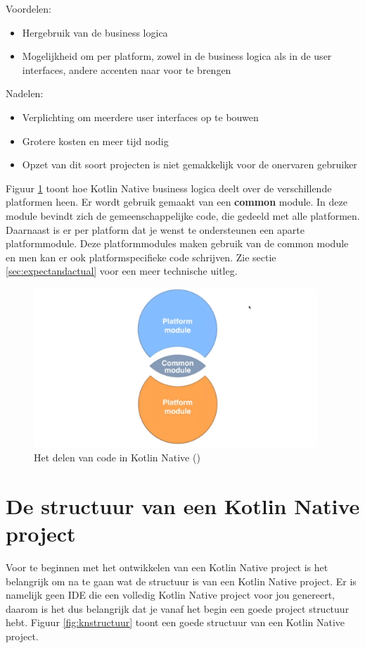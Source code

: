 Voordelen:
\begin{itemize}
	\item Hergebruik van de business logica
	\item Mogelijkheid om per platform, zowel in de business logica als in de user interfaces, andere accenten naar voor te brengen
\end{itemize}

Nadelen:
\begin{itemize}
	\item Verplichting om meerdere user interfaces op te bouwen
	\item Grotere kosten en meer tijd nodig
	\item Opzet van dit soort projecten is niet gemakkelijk voor de onervaren gebruiker
\end{itemize}

Figuur \ref{fig:sharingcode} toont hoe Kotlin Native business logica deelt over de verschillende platformen heen. Er wordt gebruik gemaakt van een \textbf{common} module. In deze module bevindt zich de gemeenschappelijke code, die gedeeld met alle platformen. Daarnaast is er per platform dat je wenst te ondersteunen een aparte platformmodule. Deze platformmodules maken gebruik van de common module en men kan er ook platformspecifieke code schrijven. Zie sectie \ref{sec:expectandactual} voor een meer technische uitleg.

\begin{figure} [ht]
	\centering
	\includegraphics[width=0.95\textwidth]{img/sharingcode}
	\caption{Het delen van code in Kotlin Native (\cite{Developine})}
	\label{fig:sharingcode}
\end{figure}

\section{De structuur van een Kotlin Native project}
Voor te beginnen met het ontwikkelen van een Kotlin Native project is het belangrijk om na te gaan wat de structuur is van een Kotlin Native project. Er is namelijk geen IDE die een volledig Kotlin Native project voor jou genereert, daarom is het dus belangrijk dat je vanaf het begin een goede project structuur hebt. Figuur \ref{fig:knstructuur} toont een goede structuur van een Kotlin Native project.

